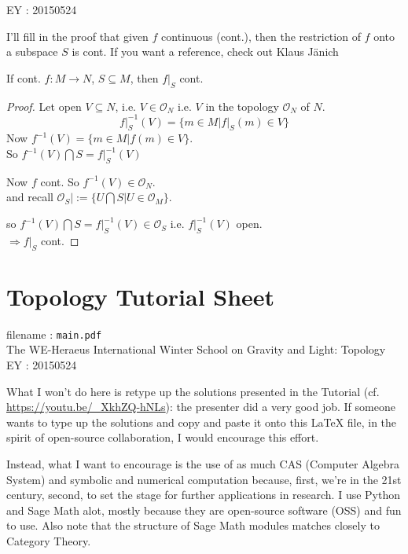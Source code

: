 \documentclass[10pt]{amsart}
\begin{document}
\begin{multicols*}{2}
EY : 20150524

I'll fill in the proof that given $f$ continuous (cont.), then the restriction of $f$ onto a subspace $S$ is cont.  If you want a reference, check out Klaus J\"{a}nich \cite[pp. 13, Ch. 1 Fundamental Concepts, Sec. Continuous Maps]{KJanich1995}

If cont. $f: M \to N$, $S \subseteq M$, then $\left. f \right|_S$ cont.  

\begin{proof}
	Let open $V \subseteq N$, i.e. $V \in \mathcal{O}_N$ i.e. $V$ in the topology $\mathcal{O}_N$ of $N$.  
	\[
	\left. f\right|_S^{-1}(V) = \lbrace m \in M | \left. f \right|_S(m) \in V \rbrace
	\]
	Now $f^{-1}(V) = \lbrace m \in M | f(m) \in V \rbrace$. \\
	So $f^{-1}(V) \bigcap S = \left. f \right|_S^{-1}(V)$
	
	Now $f$ cont. So $f^{-1}(V) \in \mathcal{O}_N$.  \\
	and recall $\left. \mathcal{O}_S \right| := \lbrace U \bigcap S | U \in \mathcal{O}_M \rbrace$.  
	
	so $f^{-1}(V) \bigcap S = \left. f \right|_S^{-1}(V) \in \mathcal{O}_S$ i.e. $\left. f\right|_S^{-1}(V)$ open. \\
	$\Longrightarrow \left. f\right|_S$ cont.  
\end{proof}

\section*{Topology Tutorial Sheet}
filename : \texttt{main.pdf} \\
The WE-Heraeus International Winter School on Gravity and Light: Topology \\

EY : 20150524  

What I won't do here is retype up the solutions presented in the Tutorial (cf. \url{https://youtu.be/_XkhZQ-hNLs}): the presenter did a very good job.  If someone wants to type up the solutions and copy and paste it onto this LaTeX file, in the spirit of open-source collaboration, I would encourage this effort. 

Instead, what I want to encourage is the use of as much CAS (Computer Algebra System) and symbolic and numerical computation because, first, we're in the 21st century, second, to set the stage for further applications in research.  I use Python and Sage Math alot, mostly because they are open-source software (OSS) and fun to use.  Also note that the structure of Sage Math modules matches closely to Category Theory.  


\end{multicols*}
\end{document}
